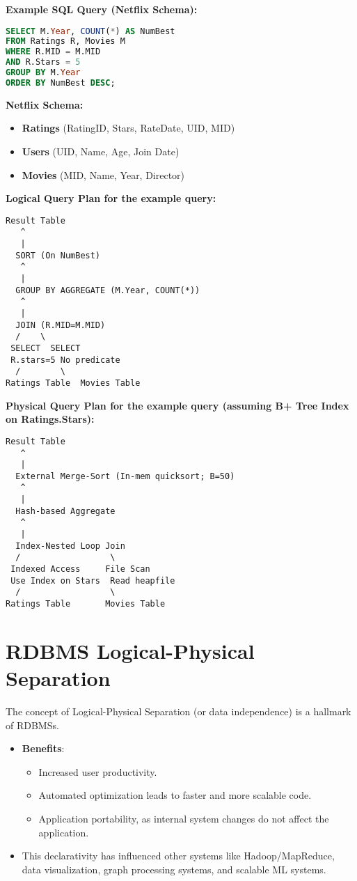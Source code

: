 \documentclass{article}
\begin{document}
\textbf{Example SQL Query (Netflix Schema):} 
\begin{lstlisting}[language=SQL]
SELECT M.Year, COUNT(*) AS NumBest
FROM Ratings R, Movies M
WHERE R.MID = M.MID
AND R.Stars = 5
GROUP BY M.Year
ORDER BY NumBest DESC;
\end{lstlisting}
\textbf{Netflix Schema:}
\begin{itemize}
    \item \textbf{Ratings} (RatingID, Stars, RateDate, UID, MID) 
    \item \textbf{Users} (UID, Name, Age, Join Date) 
    \item \textbf{Movies} (MID, Name, Year, Director) 
\end{itemize}

\textbf{Logical Query Plan for the example query:} 
\begin{verbatim}
Result Table
   ^
   |
  SORT (On NumBest)
   ^
   |
  GROUP BY AGGREGATE (M.Year, COUNT(*))
   ^
   |
  JOIN (R.MID=M.MID)
  /    \
 SELECT  SELECT
 R.stars=5 No predicate
  /        \
Ratings Table  Movies Table
\end{verbatim}

\textbf{Physical Query Plan for the example query (assuming B+ Tree Index on Ratings.Stars):} 
\begin{verbatim}
Result Table
   ^
   |
  External Merge-Sort (In-mem quicksort; B=50)
   ^
   |
  Hash-based Aggregate
   ^
   |
  Index-Nested Loop Join
  /                  \
 Indexed Access     File Scan
 Use Index on Stars  Read heapfile
  /                  \
Ratings Table       Movies Table
\end{verbatim}

\section*{RDBMS Logical-Physical Separation}
The concept of Logical-Physical Separation (or data independence) is a hallmark of RDBMSs.
\begin{itemize}
    \item \textbf{Benefits}:
        \begin{itemize}
            \item Increased user productivity.
            \item Automated optimization leads to faster and more scalable code.
            \item Application portability, as internal system changes do not affect the application.
        \end{itemize}
    \item This declarativity has influenced other systems like Hadoop/MapReduce, data visualization, graph processing systems, and scalable ML systems.
\end{itemize}
\end{document}
